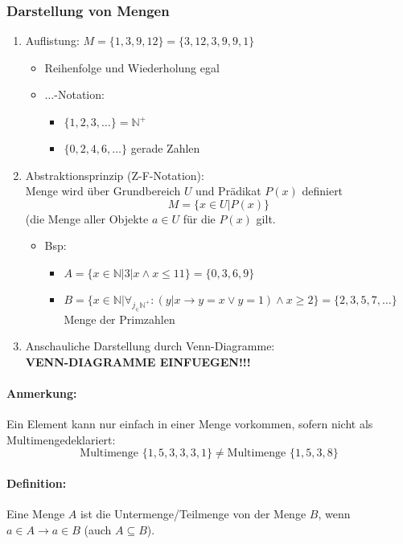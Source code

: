 \subsubsection{Darstellung von Mengen}
\begin{enumerate}
\item Auflistung: $M=\{1,3,9,12\}=\{3,12,3,9,9,1\}$
\begin{itemize}
\item Reihenfolge und Wiederholung egal
\item \glq $\ldots$\grq -Notation:
\begin{itemize}
\item $\{1,2,3,\ldots\}=\mathbb{N}^+$
\item $\{0,2,4,6,\ldots\}$ gerade Zahlen
\end{itemize}
\end{itemize}
\item Abstraktionsprinzip (Z-F-Notation):\\
Menge wird über Grundbereich $U$ und Prädikat $P(x)$ definiert
\[
M=\{x\in U | P(x)\}
\]
(die Menge aller Objekte $a\in U$ für die $P(x)$ gilt.
\begin{itemize}
\item Bsp:
\begin{itemize}
\item $A=\{x\in\mathbb{N}|3|x \land x\leq 11\} = \{0,3,6,9\}$
\item $B=\{x\in\mathbb{N}|\forall_{j_\in\mathbb{N}^+}:(y|x\rightarrow y=x \lor y=1)\land x\geq 2\}=\{2,3,5,7,\ldots \}$ Menge der Primzahlen
\end{itemize}
\end{itemize}
\item Anschauliche Darstellung durch Venn-Diagramme:\\
\textbf{VENN-DIAGRAMME EINFUEGEN!!!}
\end{enumerate}

\paragraph{Anmerkung:} Ein Element kann nur einfach in einer Menge vorkommen, sofern nicht als \glqq Multimenge\grqq deklariert:
\[
\text{Multimenge }\{1,5,3,3,3,1\} \neq \text{Multimenge }\{1,5,3,8\}
\]
\paragraph{Definition:}Eine Menge $A$ ist die Untermenge/Teilmenge von der Menge $B$, wenn $a\in A\rightarrow a\in B$ (auch $A\subseteq B$).\\

